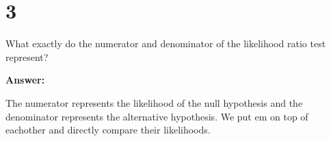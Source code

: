 \section{3}

What exactly do the numerator and denominator of the likelihood ratio test represent?

\noindent\textbf{Answer:}

The numerator represents the likelihood of the null hypothesis and the denominator represents the alternative hypothesis. We put em on top of eachother and directly compare their likelihoods. 
